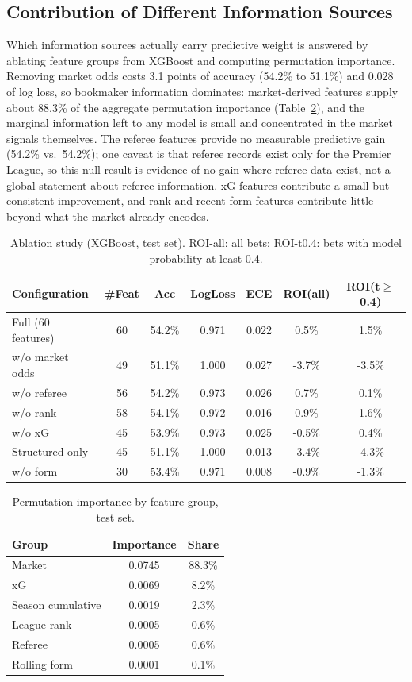 \documentclass[10pt]{article}
\begin{document}
\subsection{Contribution of Different Information Sources}
\label{sec:contrib}
Which information sources actually carry predictive weight is answered by
ablating feature groups from XGBoost and computing permutation importance.
Removing market odds costs 3.1 points of accuracy (54.2\% to 51.1\%) and 0.028 of
log loss, so bookmaker information dominates: market-derived features supply
about 88.3\% of the aggregate permutation importance
(Table~\ref{tab:perm}), and the marginal information left to any model is
small and concentrated in the market signals themselves. The referee features provide no measurable predictive gain
(54.2\% vs.\ 54.2\%); one caveat is that referee records exist only for the
Premier League, so this null result is evidence of no gain where referee data
exist, not a global statement about referee information. xG features
contribute a small but consistent improvement, and rank and recent-form
features contribute little beyond what the market already encodes.

\begin{table}[htbp]
\centering
\caption{Ablation study (XGBoost, test set). ROI-all: all bets; ROI-t0.4: bets
with model probability at least 0.4.}
\label{tab:ablation}
\begin{tabular}{lcccccc}
\toprule
Configuration & \#Feat & Acc & LogLoss & ECE & ROI(all) & ROI(t$\ge$0.4) \\
\midrule
Full (60 features) & 60 & 54.2\% & 0.971 & 0.022 & 0.5\% & 1.5\% \\
w/o market odds & 49 & 51.1\% & 1.000 & 0.027 & -3.7\% & -3.5\% \\
w/o referee & 56 & 54.2\% & 0.973 & 0.026 & 0.7\% & 0.1\% \\
w/o rank & 58 & 54.1\% & 0.972 & 0.016 & 0.9\% & 1.6\% \\
w/o xG & 45 & 53.9\% & 0.973 & 0.025 & -0.5\% & 0.4\% \\
Structured only & 45 & 51.1\% & 1.000 & 0.013 & -3.4\% & -4.3\% \\
w/o form & 30 & 53.4\% & 0.971 & 0.008 & -0.9\% & -1.3\% \\
\bottomrule
\end{tabular}
\end{table}

\begin{table}[htbp]
\centering
\caption{Permutation importance by feature group, test set.}
\label{tab:perm}
\small
\begin{tabular}{lcc}
\toprule
Group & Importance & Share \\
\midrule
Market & 0.0745 & 88.3\% \\
xG & 0.0069 & 8.2\% \\
Season cumulative & 0.0019 & 2.3\% \\
League rank & 0.0005 & 0.6\% \\
Referee & 0.0005 & 0.6\% \\
Rolling form & 0.0001 & 0.1\% \\
\bottomrule
\end{tabular}
\end{table}
\end{document}
